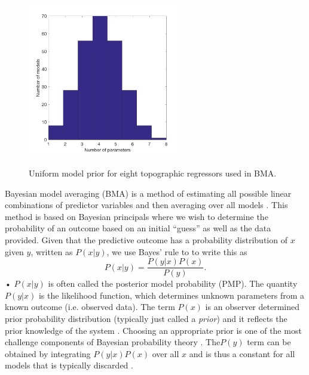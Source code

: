 \documentclass[12pt]{article}
\begin{document}
\begin{figure}
	\centering
	\includegraphics[width = 0.6\textwidth]{DistributionOfNumParams_topoRegress.png}\\
	\caption{Uniform model prior for eight topographic regressors used in BMA.}
	\label{fig:uni_model_prior}
\end{figure}

Bayesian model averaging (BMA) is a method of estimating all possible linear combinations of predictor variables and then averaging over all models \citep{Raftery1997, Wasserman2000, Raftery2005}.  This method is based on Bayesian principals where we wish to determine the probability of an outcome based on an initial ``guess'' as well as the data provided. Given that the predictive outcome has a probability distribution of $x$ given $y$, written as $P(x|y)$, we use Bayes' rule to to write this as
\begin{equation}
P(x|y) = \frac{P(y|x)P(x)}{P(y)}.
\end{equation}•
$P(x|y)$ is often called the posterior model probability (PMP). The quantity $P(y|x)$ is the likelihood function, which determines unknown parameters from a known outcome (i.e. observed data). The term $P(x)$ is an observer determined prior probability distribution (typically just called a \textit{prior}) and it reflects the prior knowledge of the system \citep{Raftery1997}. Choosing an appropriate prior is one of the most challenge components of Bayesian probability theory \citep{Wasserman2000}. The$P(y)$ term can be obtained by integrating $P(y|x)P(x)$ over all $x$ and is thus a constant for all models that is typically discarded \citep{Wasserman2000}. 
\end{document}

